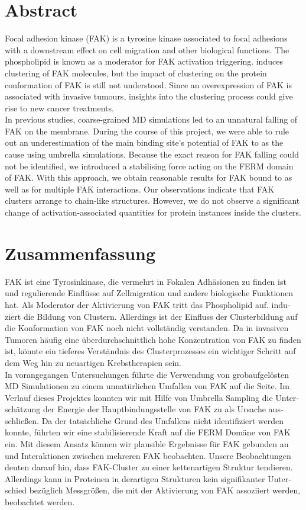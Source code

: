 \chapter*{Abstract}
Focal adhesion kinase (FAK) is a tyrosine kinase associated to focal adhesions with a downstream effect on cell migration and other biological functions. The phospholipid \pip{} is known as a moderator for FAK activation triggering. \pip{} induces clustering of FAK molecules, but the impact of clustering on the protein conformation of FAK is still not understood. Since an overexpression of FAK is associated with invasive tumours, insights into the clustering process could give rise to new cancer treatments.\\
In previous studies, coarse-grained MD simulations led to an unnatural falling of FAK on the membrane. During the course of this project, we were able to rule out an underestimation of the main binding site's potential of FAK to \pip{} as the cause using umbrella simulations. Because the exact reason for FAK falling could not be identified, we introduced a stabilising force acting on the FERM domain of FAK. With this approach, we obtain reasonable results for FAK bound to \pip{} as well as for multiple FAK interactions. Our observations indicate that FAK clusters arrange to chain-like structures. However, we do not observe a significant change of activation-associated quantities for protein instances inside the clusters.
\newpage
\leavevmode\thispagestyle{empty}\newpage
\chapter*{Zusammenfassung}
\begin{german}
	FAK ist eine Tyrosinkinase, die vermehrt in Fokalen Adhäsionen zu finden ist und regulierende Einflüsse auf Zellmigration und andere biologische Funktionen hat. Als Moderator der Aktivierung von FAK tritt das Phospholipid \pip{} auf. \pip{} induziert die Bildung von Clustern. Allerdings ist der Einfluss der Clusterbildung auf die Konformation von FAK noch nicht vollständig verstanden. Da in invasiven Tumoren häufig eine überdurchschnittlich hohe Konzentration von FAK zu finden ist, könnte ein tieferes Verständnis des Clusterprozesses ein wichtiger Schritt auf dem Weg hin zu neuartigen Krebstherapien sein.\\
	In vorangegangen Untersuchungen führte die Verwendung von grobaufgelösten MD Simulationen zu einem unnatürlichen Umfallen von FAK auf die Seite. Im Verlauf dieses Projektes konnten wir mit Hilfe von Umbrella Sampling die Unterschätzung der Energie der Hauptbindungsstelle von FAK zu \pip{} als Ursache ausschließen. Da der tatsächliche Grund des Umfallens nicht identifiziert werden konnte, führten wir eine stabilisierende Kraft auf die FERM Domäne von FAK ein. Mit diesem Ansatz können wir plausible Ergebnisse für FAK gebunden an \pip{} und Interaktionen zwischen mehreren FAK beobachten. Unsere Beobachtungen deuten darauf hin, dass FAK-Cluster zu einer kettenartigen Struktur tendieren. Allerdings kann in Proteinen in derartigen Strukturen kein signifikanter Unterschied bezüglich Messgrößen, die mit der Aktivierung von FAK assoziiert werden, beobachtet werden.
\end{german}
\newpage
